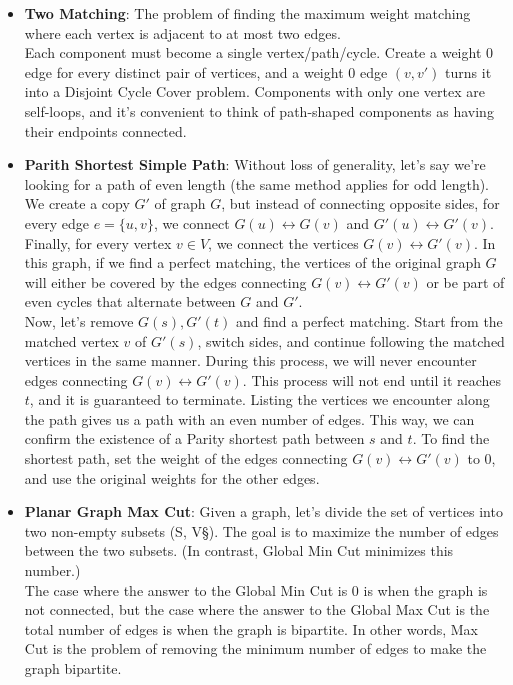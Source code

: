 \begin{itemize}
    \item \textbf{Two Matching}: The problem of finding the maximum weight matching where each vertex is adjacent to at most two edges.\\
      Each component must become a single vertex/path/cycle. Create a weight 0 edge for every distinct pair of vertices, and a weight 0 edge $(v,v')$ turns it into a Disjoint Cycle Cover problem. Components with only one vertex are self-loops, and it's convenient to think of path-shaped components as having their endpoints connected.
    \item \textbf{Parith Shortest Simple Path}: Without loss of generality, let's say we're looking for a path of even length (the same method applies for odd length). We create a copy $G'$ of graph $G$, but instead of connecting opposite sides, for every edge $e = \{u, v\}$, we connect $G(u) \leftrightarrow G(v)$ and $G'(u) \leftrightarrow G'(v)$. Finally, for every vertex $v \in V$, we connect the vertices $G(v) \leftrightarrow G'(v)$. In this graph, if we find a perfect matching, the vertices of the original graph $G$ will either be covered by the edges connecting $G(v) \leftrightarrow G'(v)$ or be part of even cycles that alternate between $G$ and $G'$. \\
      Now, let's remove $G(s), G'(t)$ and find a perfect matching. Start from the matched vertex $v$ of $G'(s)$, switch sides, and continue following the matched vertices in the same manner. During this process, we will never encounter edges connecting $G(v) \leftrightarrow G'(v)$. This process will not end until it reaches $t$, and it is guaranteed to terminate. Listing the vertices we encounter along the path gives us a path with an even number of edges. This way, we can confirm the existence of a Parity shortest path between $s$ and $t$. To find the shortest path, set the weight of the edges connecting $G(v) \leftrightarrow G'(v)$ to 0, and use the original weights for the other edges.
    \item \textbf{Planar Graph Max Cut}: Given a graph, let's divide the set of vertices into two non-empty subsets (S, V\S). The goal is to maximize the number of edges between the two subsets. (In contrast, Global Min Cut minimizes this number.) \\
The case where the answer to the Global Min Cut is 0 is when the graph is not connected, but the case where the answer to the Global Max Cut is the total number of edges is when the graph is bipartite. In other words, Max Cut is the problem of removing the minimum number of edges to make the graph bipartite.\\

\end{itemize}

